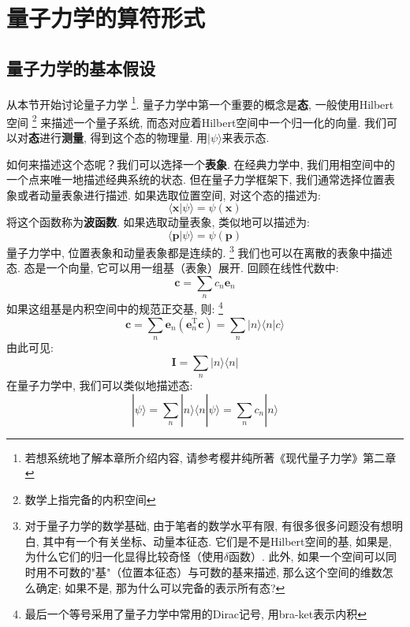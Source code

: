 \chapter{量子力学的算符形式}

    \section{量子力学的基本假设}
        从本节开始讨论量子力学
        \footnote{若想系统地了解本章所介绍内容, 请参考樱井纯所著《现代量子力学》第二章\cite{MQM}}.
        量子力学中第一个重要的概念是\textbf{态}, 一般使用Hilbert空间
        \footnote{数学上指完备的内积空间}
        来描述一个量子系统, 而态对应着Hilbert空间中一个归一化的向量.
        我们可以对\textbf{态}进行\textbf{测量}, 得到这个态的物理量.
        用$|\psi\rangle$来表示态.

        如何来描述这个态呢？我们可以选择一个\textbf{表象}. 
        在经典力学中, 我们用相空间中的一个点来唯一地描述经典系统的状态. 
        但在量子力学框架下, 我们通常选择位置表象或者动量表象进行描述. 
        如果选取位置空间, 对这个态的描述为: 
        \begin{equation}
            \langle \bm{x} | \psi \rangle = \psi(\bm{x})
        \end{equation}
        将这个函数称为\textbf{波函数}. 如果选取动量表象, 类似地可以描述为:
        \begin{equation}
            \langle \bm{p} | \psi \rangle = \psi(\bm{p})
        \end{equation}
        量子力学中, 位置表象和动量表象都是连续的.
        \footnote{对于量子力学的数学基础, 由于笔者的数学水平有限, 有很多很多问题没有想明白, 
        其中有一个有关坐标、动量本征态. 它们是不是Hilbert空间的基, 
        如果是, 为什么它们的归一化显得比较奇怪（使用$\delta$函数）. 
        此外, 如果一个空间可以同时用不可数的"基"（位置本征态）与可数的基来描述, 那么这个空间的维数怎么确定;
        如果不是, 那为什么可以完备的表示所有态?}
        我们也可以在离散的表象中描述态.
        态是一个向量, 它可以用一组基（表象）展开. 回顾在线性代数中:  
        \begin{equation}
            \bm{c} = \sum_n c_n \bm{e}_n
        \end{equation}
        如果这组基是内积空间中的规范正交基, 则: 
        \footnote{最后一个等号采用了量子力学中常用的Dirac记号, 用bra-ket表示内积}
        \begin{equation}
            \bm{c} = \sum_n \bm{e}_n (\bm{e}_n^\mathrm{T}\bm{c}) 
            = \sum_n |n\rangle \langle n|c\rangle
        \end{equation}
        由此可见: 
        \begin{equation}
            \bm{I} = \sum_n |n\rangle \langle n|
        \end{equation}
        在量子力学中, 我们可以类似地描述态: 
        \begin{equation}
            |\psi \rangle = \sum_n |n\rangle \langle n|\psi \rangle = \sum_n c_n |n\rangle
        \end{equation}

